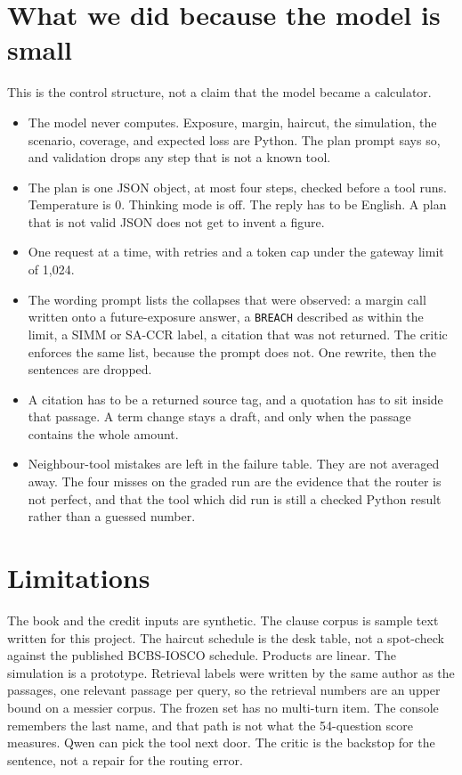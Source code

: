 \documentclass[11pt,a4paper]{article}
\begin{document}
\section{What we did because the model is small}

This is the control structure, not a claim that the model became a calculator.

\begin{itemize}
  \item The model never computes. Exposure, margin, haircut, the simulation, the scenario, coverage, and expected loss are Python. The plan prompt says so, and validation drops any step that is not a known tool.
  \item The plan is one JSON object, at most four steps, checked before a tool runs. Temperature is 0. Thinking mode is off. The reply has to be English. A plan that is not valid JSON does not get to invent a figure.
  \item One request at a time, with retries and a token cap under the gateway limit of 1{,}024.
  \item The wording prompt lists the collapses that were observed: a margin call written onto a future-exposure answer, a \texttt{BREACH} described as within the limit, a SIMM or SA-CCR label, a citation that was not returned. The critic enforces the same list, because the prompt does not. One rewrite, then the sentences are dropped.
  \item A citation has to be a returned source tag, and a quotation has to sit inside that passage. A term change stays a draft, and only when the passage contains the whole amount.
  \item Neighbour-tool mistakes are left in the failure table. They are not averaged away. The four misses on the graded run are the evidence that the router is not perfect, and that the tool which did run is still a checked Python result rather than a guessed number.
\end{itemize}

\section{Limitations}

The book and the credit inputs are synthetic. The clause corpus is sample text written for this project. The haircut schedule is the desk table, not a spot-check against the published BCBS-IOSCO schedule. Products are linear. The simulation is a prototype. Retrieval labels were written by the same author as the passages, one relevant passage per query, so the retrieval numbers are an upper bound on a messier corpus. The frozen set has no multi-turn item. The console remembers the last name, and that path is not what the 54-question score measures. Qwen can pick the tool next door. The critic is the backstop for the sentence, not a repair for the routing error.
\end{document}
